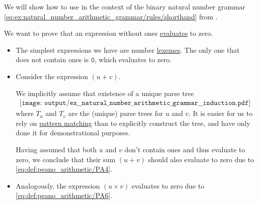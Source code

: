 \begin{example}\label{ex:natural_number_arithmetic_grammar/induction}
  We will show how to use  in the context of the binary natural number grammar \eqref{eq:ex:natural_number_arithmetic_grammar/rules/shorthand} from .

  We want to prove that an expression without ones \hyperref[rem:evaluation]{evaluates} to zero.

  \begin{itemize}
    \item The simplest expressions we have are number \hyperref[rem:abstract_syntax_tree/lexical]{lexemes}. The only one that does not contain ones is \( \mathtt{0} \), which evaluates to zero.

    \item Consider the expression \( (u + v) \).

    We implicitly assume that existence of a unique parse tree
    \begin{equation*}
      \begin{aligned}
        \texttt{[image: output/ex\_\_natural\_number\_arithmetic\_grammar\_\_induction.pdf]}
      \end{aligned}
    \end{equation*}
    where \( T_u \) and \( T_v \) are the (unique) parse trees for \( u \) and \( v \). It is easier for us to rely on \hyperref[rem:evaluation]{pattern matching} than to explicitly construct the tree, and have only done it for demonstrational purposes.

    Having assumed that both \( u \) and \( v \) don't contain ones and thus evaluate to zero, we conclude that their sum \( (u + v) \) should also evaluate to zero due to \ref{eq:def:peano_arithmetic/PA4}.

    \item Analogously, the expression \( (u \times v) \) evaluates to zero due to \ref{eq:def:peano_arithmetic/PA6}.
  \end{itemize}
\end{example}

